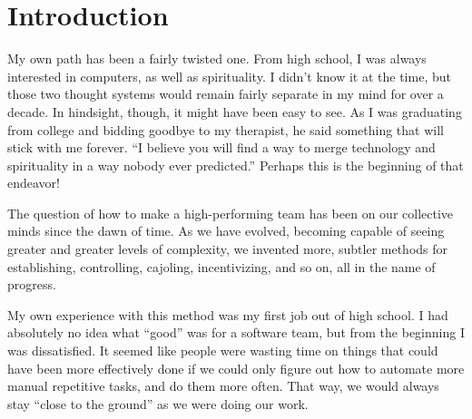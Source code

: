 \chapter{Introduction}

My own path has been a fairly twisted one. From high school, I was always interested in computers, as well as
spirituality. I didn't know it at the time, but those two thought systems would remain fairly separate in my mind
for over a decade. In hindsight, though, it might have been easy to see. As I was graduating from college
and bidding goodbye to my therapist, he said something that will stick with me forever. ``I believe you will find
a way to merge technology and spirituality in a way nobody ever predicted.'' Perhaps this is the beginning
of that endeavor!

The question of how to make a high-performing team has been on our collective minds since the dawn of time.
As we have evolved, becoming capable of seeing greater and greater levels of complexity, we invented
more, subtler methods for establishing, controlling, cajoling, incentivizing, and so on, all in the name of progress.

My own experience with this method was my first job out of high school. I had absolutely no idea what ``good''
was for a software team, but from the beginning I was dissatisfied. It seemed like people were wasting time on 
things that could have been more effectively done if we could only figure out how to automate more manual
repetitive tasks, and do them more often. That way, we would always stay ``close to the ground'' as we were
doing our work.